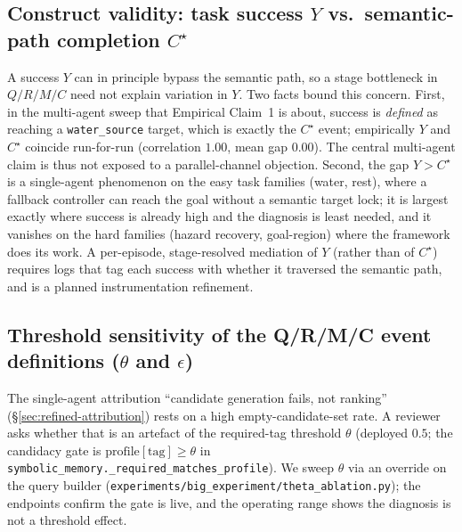 \documentclass{article}
\newcommand{\method}[1]{\texttt{#1}}
\begin{document}
\subsection{Construct validity: task success $Y$ vs.\ semantic-path completion $C^\star$}
\label{app:y-vs-c}

A success $Y$ can in principle bypass the semantic path, so a stage bottleneck in $Q/R/M/C$ need not explain variation in $Y$. Two facts bound this concern. First, in the multi-agent sweep that Empirical Claim~1 is about, success is \emph{defined} as reaching a \texttt{water\_source} target, which is exactly the $C^\star$ event; empirically $Y$ and $C^\star$ coincide run-for-run (correlation $1.00$, mean gap $0.00$). The central multi-agent claim is thus not exposed to a parallel-channel objection. Second, the gap $Y>C^\star$ is a single-agent phenomenon on the easy task families (water, rest), where a fallback controller can reach the goal without a semantic target lock; it is largest exactly where success is already high and the diagnosis is least needed, and it vanishes on the hard families (hazard recovery, goal-region) where the framework does its work. A per-episode, stage-resolved mediation of $Y$ (rather than of $C^\star$) requires logs that tag each success with whether it traversed the semantic path, and is a planned instrumentation refinement.

\subsection{Threshold sensitivity of the Q/R/M/C event definitions ($\theta$ and $\epsilon$)}
\label{app:theta-robustness}

The single-agent attribution ``candidate generation fails, not ranking''
(\S\ref{sec:refined-attribution}) rests on a high empty-candidate-set rate. A
reviewer asks whether that is an artefact of the required-tag threshold
$\theta$ (deployed $0.5$; the candidacy gate is
$\mathrm{profile}[\text{tag}]\ge\theta$ in
\method{symbolic\_memory.\_required\_matches\_profile}). We sweep $\theta$ via an
override on the query builder (\method{experiments/big\_experiment/theta\_ablation.py});
the endpoints confirm the gate is live, and the operating range shows the
diagnosis is not a threshold effect.
\end{document}
